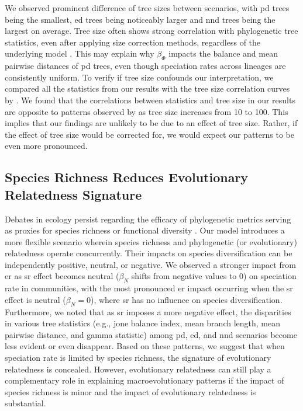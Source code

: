 {We observed prominent difference of tree sizes between scenarios, with \acrshort{pd} trees being the smallest, \acrshort{ed} trees being noticeably larger and \acrshort{nnd} trees being the largest on average. Tree size often shows strong correlation with phylogenetic tree statistics, even after applying size correction methods, regardless of the underlying model \citep{janzen_phylogenetic_2024}. This may explain why $\beta_\varPhi$ impacts the balance and mean pairwise distances of \acrshort{pd} trees, even though speciation rates across lineages are consistently uniform. To verify if tree size confounds our interpretation, we compared all the statistics from our results with the tree size correlation curves by \citet{janzen_phylogenetic_2024}. We found that the correlations between statistics and tree size in our results are opposite to patterns observed by \citet{janzen_phylogenetic_2024} as tree size increases from 10 to 100. This implies that our findings are unlikely to be due to an effect of tree size. Rather, if the effect of tree size would be corrected for, we would expect our patterns to be even more pronounced.

\subsection{Species Richness Reduces Evolutionary Relatedness Signature}
\label{ch1::sec::discussion::sr-reduce-er}
Debates in ecology persist regarding the efficacy of phylogenetic metrics serving as proxies for species richness or functional diversity \citep{mazel_prioritizing_2018,owen_global_2019}. Our model introduces a more flexible scenario wherein species richness and phylogenetic (or evolutionary) relatedness operate concurrently. Their impacts on species diversification can be independently positive, neutral, or negative. We observed a stronger impact from \acrshort{er} as \acrshort{sr} effect becomes neutral ($\beta_N$ shifts from negative values to 0) on speciation rate in communities, with the most pronounced \acrshort{er} impact occurring when the \acrshort{sr} effect is neutral ($\beta_N = 0$), where \acrshort{sr} has no influence on species diversification. Furthermore, we noted that as \acrshort{sr} imposes a more negative effect, the disparities in various tree statistics (e.g., \acrshort{jone} balance index, mean branch length, mean pairwise distance, and \acrshort{gamma} statistic) among \acrshort{pd}, \acrshort{ed}, and \acrshort{nnd} scenarios become less evident or even disappear. Based on these patterns, we suggest that when speciation rate is limited by species richness, the signature of evolutionary relatedness is concealed. However, evolutionary relatedness can still play a complementary role in explaining macroevolutionary patterns if the impact of species richness is minor and the impact of evolutionary relatedness is substantial.

}
